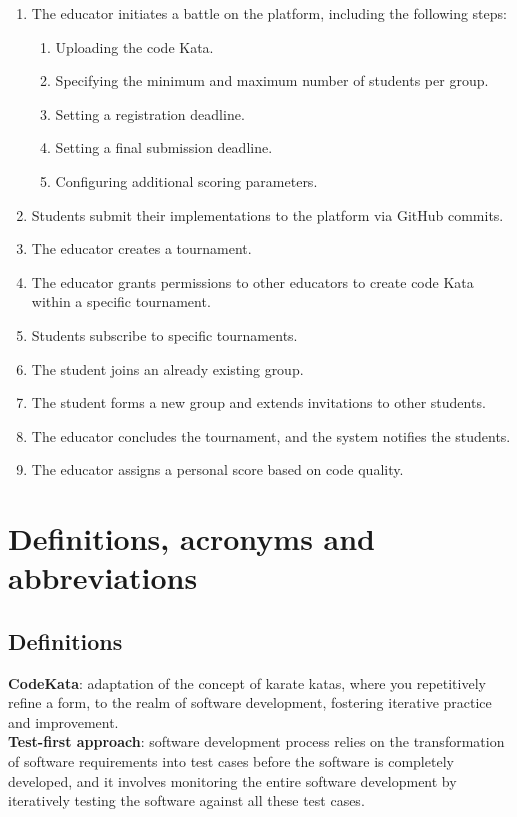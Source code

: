 \documentclass[12pt, a4paper]{report}
\begin{document}
    \begin{enumerate}
        \item The educator initiates a battle on the platform, including the following steps:
            \begin{enumerate}
                \item Uploading the code Kata.
                \item Specifying the minimum and maximum number of students per group.
                \item Setting a registration deadline.
                \item Setting a final submission deadline.
                \item Configuring additional scoring parameters.
            \end{enumerate}
        \item Students submit their implementations to the platform via GitHub commits.
        \item The educator creates a tournament.
        \item The educator grants permissions to other educators to create code Kata within a specific tournament.
        \item Students subscribe to specific tournaments.
        \item The student joins an already existing group.
        \item The student forms a new group and extends invitations to other students.
        \item The educator concludes the tournament, and the system notifies the students.
        \item The educator assigns a personal score based on code quality.
    \end{enumerate}

    \section{Definitions, acronyms and abbreviations}

    \subsection{Definitions}
    \textbf{CodeKata}: adaptation of the concept of karate katas, where you repetitively refine a form, to the realm of software development, fostering iterative practice and improvement. \\
    \textbf{Test-first approach}: software development process relies on the transformation of software requirements into test cases before the software is completely developed, and it involves monitoring the entire software development by iteratively testing the software against all these test cases.
    
\end{document}
